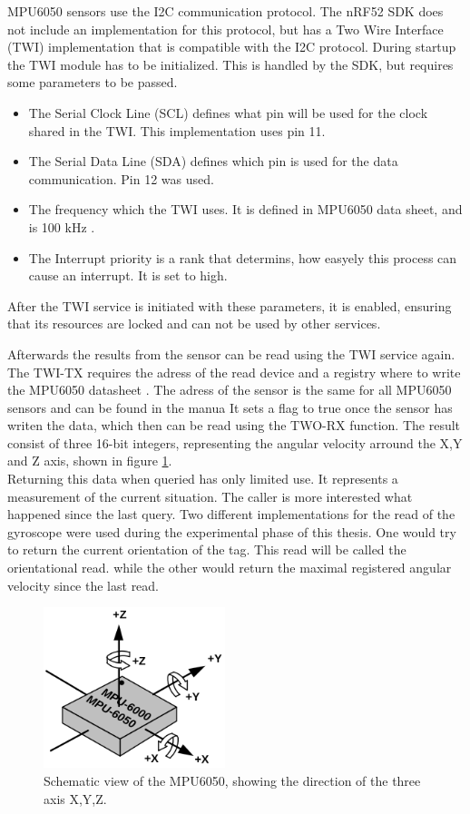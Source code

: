 MPU6050 sensors use the I2C communication protocol.
The nRF52 SDK does not include an implementation for this protocol, but has a Two Wire Interface (TWI) implementation that is compatible with the I2C protocol.
During startup the TWI module has to be initialized.
This is handled by the SDK, but requires some parameters to be passed.
\begin{itemize}
	\item The Serial Clock Line (SCL) defines what pin will be used for the clock shared in the TWI. This implementation uses pin 11.
	\item The Serial Data Line (SDA) defines which pin is used for the data communication. Pin 12 was used.
	\item The frequency which the TWI uses. It is defined in MPU6050 data sheet, and is 100 kHz \cite{MPU6050}.
	\item The Interrupt priority is a rank that determins, how easyely this process can cause an interrupt. It is set to high.
\end{itemize}
After the TWI service is initiated with these parameters, it is enabled, ensuring that its resources are locked and can not be used by other services.


Afterwards the results from the sensor can be read using the TWI service again.
The TWI-TX requires the adress of the read device and a registry where to write the MPU6050 datasheet \cite{MPU6050}.
The adress of the sensor is the same for all MPU6050 sensors and can be found in the manua
It sets a flag to true once the sensor has writen the data, which then can be read using the TWO-RX function.
The result consist of three 16-bit integers, representing the angular velocity arround the X,Y and Z axis, shown in figure \ref{f:MPU6050_orientation}.\\
Returning this data when queried has only limited use.
It represents a measurement of the current situation.
The caller is more interested what happened since the last query.
Two different implementations for the read of the gyroscope were used during the experimental phase of this thesis.
One would try to return the current orientation of the tag. This read will be called the orientational read.
 while the other would return the maximal registered angular velocity since the last read.




\begin{figure}[ht!]
\centering
\includegraphics[width=200px]{graphics/MPU6050_orientation.png}
\caption{Schematic view of the MPU6050, showing the direction of the three axis X,Y,Z.}
\label{f:MPU6050_orientation}
\end{figure}


